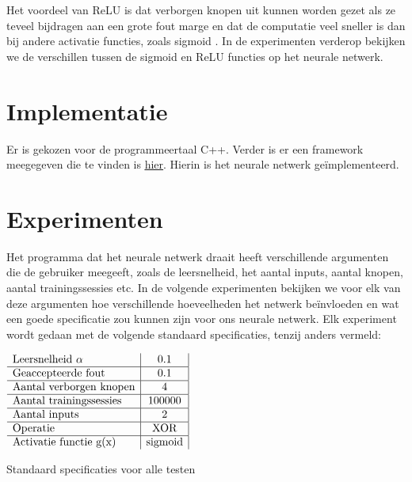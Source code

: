 \documentclass[10pt]{article}
\begin{document}
Het voordeel van ReLU is dat verborgen knopen uit kunnen worden gezet als ze teveel bijdragen aan een grote fout marge en dat de computatie veel sneller is dan bij andere activatie functies, zoals sigmoid \cite{relu}. In de experimenten verderop bekijken we de verschillen tussen de sigmoid en ReLU functies op het neurale netwerk.


\section{Implementatie}
Er is gekozen voor de programmeertaal C++. Verder is er een framework meegegeven die te vinden is \href{http://liacs.leidenuniv.nl/~kosterswa/AI/nn.html}{\underline{hier}}\cite{assignment}. Hierin is het neurale netwerk ge\"implementeerd.

\section{Experimenten}
Het programma dat het neurale netwerk draait heeft verschillende argumenten die de gebruiker meegeeft, zoals de leersnelheid, het aantal inputs, aantal knopen, aantal trainingssessies etc. In de volgende experimenten bekijken we voor elk van deze argumenten hoe verschillende hoeveelheden het netwerk be\"invloeden en wat een goede specificatie zou kunnen zijn voor ons neurale netwerk.
Elk experiment wordt gedaan met de volgende standaard specificaties, tenzij anders vermeld:

\begin{table}[ht]
    \centering
      $\begin{array}{ l | c | c}
        \text{Leersnelheid } \alpha & 0.1 \\ \hline
        \text{Geaccepteerde fout} & 0.1 \\  \hline
        \text{Aantal verborgen knopen} & 4 \\  \hline
        \text{Aantal trainingssessies} & 100000 \\  \hline
        \text{Aantal inputs} & 2 \\  \hline
        \text{Operatie} & \text{XOR} \\  \hline
        \text{Activatie functie g(x)} & \text{sigmoid} 
      \end{array}$
    \caption{Standaard specificaties voor alle testen}
    \label{tab:my_label}
\end{table}








\end{document}
